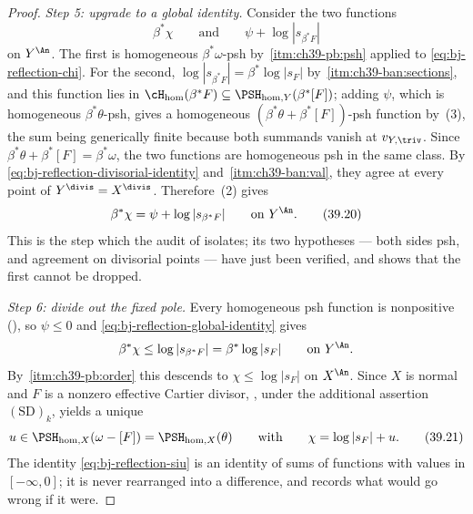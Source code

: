 \begin{proof}
\medskip
\noindent\emph{Step 5: upgrade to a global identity.}
Consider the two functions
\[
 \beta^*\chi
 \qquad\text{and}\qquad
 \psi+\log|s_{\beta^*F}|
\]
on $Y^{\An}$.  The first is homogeneous $\beta^*\omega$-psh by
\,\cref{itm:ch39-pb:psh} applied to
\eqref{eq:bj-reflection-chi}.  For the second,
$\log|s_{\beta^*F}|=\beta^*\log|s_F|$ by
\,\cref{itm:ch39-ban:sections}, and this function lies
in $\cH_{\mathrm{hom}}(\beta^*F)\subseteq
\PSH_{\mathrm{hom},Y}(\beta^*[F])$; adding $\psi$, which is homogeneous
$\beta^*\theta$-psh, gives a homogeneous
$(\beta^*\theta+\beta^*[F])$-psh function by
\,(3), the sum being generically finite
because both summands vanish at $v_{Y,\triv}$.  Since
$\beta^*\theta+\beta^*[F]=\beta^*\omega$, the two functions are
homogeneous psh in the same class.  By
\eqref{eq:bj-reflection-divisorial-identity} and
\,\cref{itm:ch39-ban:val}, they agree at every point
of $Y^{\divis}=X^{\divis}$.  Therefore
\,(2) gives
\[
             \beta^*\chi
             =\psi+\log|s_{\beta^*F}|
             \qquad\text{on }Y^{\An}.
\tag{39.20}\label{eq:bj-reflection-global-identity}
\]
This is the step which the audit of  isolates;
its two hypotheses --- both sides psh, and agreement on divisorial points
--- have just been verified, and 
shows that the first cannot be dropped.

\medskip
\noindent\emph{Step 6: divide out the fixed pole.}
Every homogeneous psh function is nonpositive
(), so $\psi\le0$ and
\eqref{eq:bj-reflection-global-identity} gives
\[
 \beta^*\chi\le\log|s_{\beta^*F}|=\beta^*\log|s_F|
 \qquad\text{on }Y^{\An}.
\]
By \,\cref{itm:ch39-pb:order} this descends to
$\chi\le\log|s_F|$ on $X^{\An}$.  Since $X$ is normal and $F$ is a
nonzero effective Cartier divisor,
, under the additional assertion
$\mathrm{(SD)}_k$, yields a unique
\[
 u\in\PSH_{\mathrm{hom},X}(\omega-[F])=\PSH_{\mathrm{hom},X}(\theta)
 \qquad\text{with}\qquad
 \chi=\log|s_F|+u .
\tag{39.21}\label{eq:bj-reflection-siu}
\]
The identity \eqref{eq:bj-reflection-siu} is an identity of sums of
functions with values in $[-\infty,0]$; it is never rearranged into a
difference, and  records what would go wrong
if it were.


\end{proof}

